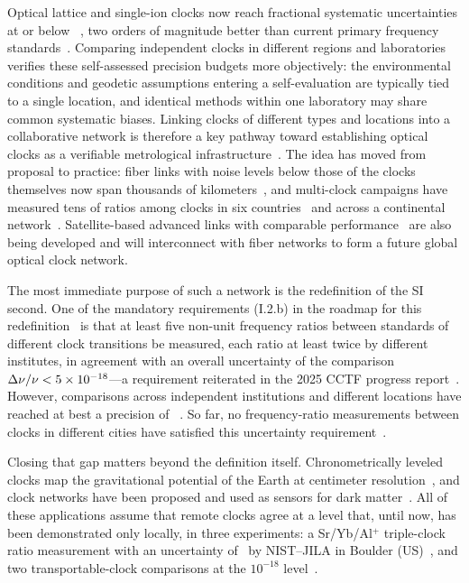 Optical lattice and single-ion clocks now reach fractional systematic
uncertainties at or below \selfEvalBound~\citep{mcgrew2018geodesy,
aeppli2024sr, lu2025ntsc, marshall2025alplus, jia2026sr, arnold2026lu,
zhang2026ca, zhu2026yb}, two orders of
magnitude better than current primary frequency standards~\citep{heavner2014nistf2,
weyers2018ptbcsf}. Comparing independent clocks in different regions
and laboratories verifies these self-assessed precision budgets more
objectively: the environmental conditions and geodetic assumptions
entering a self-evaluation are typically tied to a single location, and
identical methods within one laboratory may share common systematic
biases. Linking clocks of different types and locations into a
collaborative network is therefore a key pathway toward establishing
optical clocks as a verifiable metrological
infrastructure~\citep{komar2014quantumnetwork, riehle2017networks}. The
idea has moved from proposal to practice: fiber links with noise levels
below those of the clocks themselves now span thousands of
kilometers~\citep{schioppo2022cavities, chen2026dissemination}, and
multi-clock campaigns have measured tens of ratios among clocks in six
countries~\citep{lindvall2025coordinated} and across a continental
network~\citep{pizzocaro2026european}. Satellite-based advanced links
with comparable performance~\citep{shen2021satellite, shen2022freespace,
caldwell2023geo, derevianko2022spaceclock} are also being developed and
will interconnect with fiber networks to form a future global optical
clock network.

The most immediate purpose of such a network is the redefinition of the
SI second. One of the mandatory requirements (I.2.b) in the roadmap for
this redefinition~\citep{dimarcq2024roadmap} is that at least five
non-unit frequency ratios between standards of different clock
transitions be measured, each ratio at least twice by different
institutes, in agreement with an overall uncertainty of the comparison
$\Delta\nu/\nu < 5\times10^{-18}$---a requirement reiterated in the 2025
CCTF progress report~\citep{cctf2025strategy, cctf2025taskforce}.
However, comparisons across independent institutions and different
locations have reached at best a precision of
~\citep{pizzocaro2026european}. So far, no frequency-ratio
measurements between clocks in different cities have satisfied this
uncertainty requirement~\citep{fortier2026review}.

Closing that gap matters beyond the definition itself. Chronometrically
leveled clocks map the gravitational potential of the Earth at
centimeter resolution~\citep{grotti2018geodesy, mcgrew2018geodesy,
takamoto2020redshift}, and clock networks have been proposed and used as
sensors for dark matter~\citep{derevianko2014topological,
wcislo2018global, beloy2021bacon}. All of these applications assume
that remote clocks agree at a level that, until now, has been
demonstrated only locally, in three experiments: a Sr/Yb/Al$^+$
triple-clock ratio measurement with an uncertainty of
~by NIST--JILA in Boulder (US)~\citep{aeppli2026nist},
and two transportable-clock comparisons at the $10^{-18}$
level~\citep{takamoto2020redshift,
vishwakarma2026interspeciesclockcomparison5}.

